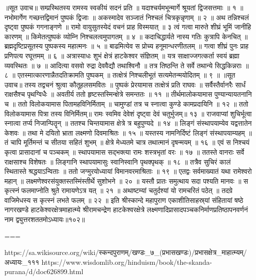 ॥सूत उवाच॥
सम्प्रस्थितस्य रामस्य स्वकीयं सदनं प्रति ॥
यदाश्चर्यमभून्मार्गे श्रूयतां द्विजसत्तमाः ॥ १ ॥
नभोमार्गेण गच्छत्तद्विमानं पुष्पकं द्विजाः ॥
अकस्मादेव सञ्जातं निश्चलं चित्रकृन्नृणाम् ॥ २ ॥
अथ तन्निश्चलं दृष्ट्वा पुष्पकं गगनाङ्गणे ॥
रामो वायुसुतस्येदं वचनं प्राह विस्मयात् ॥ ३
त्वं गत्वा मारुते शीघ्रं भूमिं जानीहि कारणम् ॥
किमेतत्पुष्पकं व्योम्नि निश्चलत्वमुपागतम् ॥ ४ ॥
कदाचिद्धार्यते नास्य गतिः कुत्रापि केनचित् ॥
ब्रह्मदृष्टिप्रसूतस्य पुष्पकस्य महात्मनः ॥ ५ ॥
बाढमित्येव स प्रोच्य हनूमान्धरणीतलम् ॥
गत्वा शीघ्रं पुनः प्राह प्रणिपत्य रघूत्तमम् ॥ ६ ॥
अत्रास्याधः शुभं क्षेत्रं हाटकेश्वर संज्ञितम् ॥
यत्र साक्षाज्जगत्कर्ता स्वयं ब्रह्मा व्यवस्थितः ॥ ७ ॥
आदित्या वसवो रुद्रा देववैद्यौ तथाश्विनौ ॥
तत्र तिष्ठन्ति ते सर्वे तथान्ये सिद्धकिन्नराः ॥ ८ ॥
एतस्मात्कारणान्नैतदतिक्रामति पुष्पकम् ॥
तत्क्षेत्रं निश्चलीभूतं सत्यमेतन्मयोदितम् ॥ ९ ॥
॥सूत उवाच॥
तस्य तद्वचनं श्रुत्वा कौतूहलसमवितः ॥
पुष्पकं प्रेरयामास तत्क्षेत्रं प्रति राघवः ॥
सर्वैस्तैर्वानरैः सार्धं राक्षसैश्च पृथग्विधैः ॥
अवतीर्य ततो हृष्टस्तस्मिन्क्षेत्रे समन्ततः ॥ ११ ॥
तीर्थमालोकयामास पुण्यान्यायतनानि च ॥
ततो विलोकयामास पितामहविनिर्मिताम् ॥
चामुण्डां तत्र च स्नात्वा कुण्डे कामप्रदायिनि ॥ १२ ॥
ततो विलोकयामास पित्रा तस्य विनिर्मितम्॥
रामः स्वमिव देवेशं दृष्ट्वा देवं चतुर्भुजम्॥ १३ ॥
राजवाप्यां शुचिर्भूत्वा स्नात्वा तर्प्य निजान्पितॄन् ॥
ततश्च चिन्तयामास क्षेत्रे त्र बहुपुण्यदे ॥ १४ ॥
लिङ्गं संस्थापयाम्येव यद्वत्तातेन केशवः ॥
तथा मे दयितो भ्राता लक्ष्मणो दिवमाश्रितः ॥ १५ ॥
यस्तस्य नामनिर्दिष्टं लिङ्गं संस्थापयाम्यहम् ॥
तं चापि मूर्तिमन्तं च सीतया सहितं शुभम् ॥
क्षेत्रे मेध्यतमे चात्र तथात्मानं दृषन्मयम् ॥ १६ ॥
एवं स निश्चयं कृत्वा प्रासादानां च पञ्चकम् ॥
स्थापयामास सद्भक्त्या रामः शस्त्रभृतां वरः ॥ १७ ॥
ततस्ते वानराः सर्वे राक्षसाश्च विशेषतः ॥
लिङ्गानि स्थापयामासुः स्वानिस्वानि पृथक्पृथक् ॥ १८ ॥
तत्रैव सुचिरं कालं स्थितास्ते श्रद्धयाऽन्विताः ॥
ततो जग्मुरयोध्यायां विमानवरमाश्रिताः ॥ १९ ॥
एतद्वः सर्वमाख्यातं यथा रामेश्वरो महान् ॥
लक्ष्मणेश्वरसंयुक्तस्तस्मिंस्तीर्थे सुशोभने ॥ २० ॥
यस्तौ प्रातः समुत्थाय सदा पश्यति मानवः ॥
स कृत्स्नं फलमाप्नोति श्रुते रामायणेऽत्र यत् ॥ २१ ॥
अथाष्टम्यां चतुर्दश्यां यो रामचरितं पठेत् ॥
तदग्रे वाजिमेधस्य स कृत्स्नं लभते फलम् ॥ २२ ॥
इति श्रीस्कान्दे महापुराण एकाशीतिसाहस्र्यां संहितायां षष्ठे नागरखण्डे हाटकेश्वरक्षेत्रमाहात्म्ये श्रीरामचन्द्रेण हाटकेश्वरक्षेत्रे लक्ष्मणादिप्रासादपञ्चकनिर्माणप्रतिष्ठापनवर्णनं नाम द्व्युत्तरशततमोऽध्यायः॥१०२॥

===

https://sa.wikisource.org/wiki/स्कन्दपुराणम्/खण्डः_७_(प्रभासखण्डः)/प्रभासक्षेत्र_माहात्म्यम्/अध्यायः_१११
https://www.wisdomlib.org/hinduism/book/the-skanda-purana/d/doc626899.html

